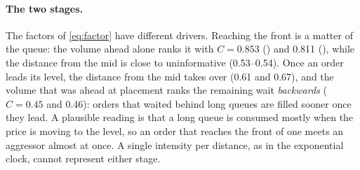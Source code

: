 \paragraph{The two stages.}
The factors of \eqref{eq:factor} have different drivers. Reaching the front is
a matter of the queue: the volume ahead alone ranks it with $C=0.853$ (\SOL) and
0.811 (\ETH), while the distance from the mid is close to uninformative (0.53--0.54).
Once an order leads its level, the distance from the mid takes over (0.61 and
0.67), and the volume that was ahead at placement ranks the remaining wait
\emph{backwards} ($C=0.45$ and 0.46): orders that waited behind long queues are
filled sooner once they lead. A plausible reading is that a long queue is consumed
mostly when the price is moving to the level, so an order that reaches the front
of one meets an aggressor almost at once. A single intensity per distance, as in the exponential clock,
cannot represent either stage.
